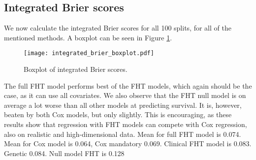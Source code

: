 


\subsection{Integrated Brier scores}
We now calculate the integrated Brier scores for all 100 splits, for all of the mentioned methods.
A boxplot can be seen in Figure \ref{fig:neuroblastoma-integrated-brier}.
\begin{figure}
\caption{Boxplot of integrated Brier scores.}
\label{fig:neuroblastoma-integrated-brier}
\centering
\texttt{[image: integrated\_brier\_boxplot.pdf]}
\end{figure}
The full FHT model performs best of the FHT models, which again should be the case, as it can use all covariates.
We also observe that the FHT null model is on average a lot worse than all other models at predicting survival.
It is, however, beaten by both Cox models, but only slightly.
This is encouraging, as these results show that regression with FHT models can compete with Cox regression, also on realistic and high-dimensional data.
Mean for full FHT model is 0.074.
Mean for Cox model is 0.064, Cox mandatory 0.069.
Clinical FHT model is 0.083.
Genetic 0.084.
Null model FHT is 0.128
